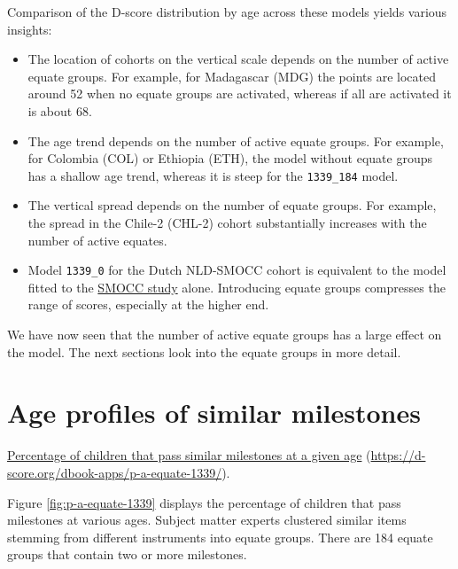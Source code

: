\documentclass[
]{book}
\begin{document}
Comparison of the D-score distribution by age across these models yields various insights:

\begin{itemize}
\item
  The location of cohorts on the vertical scale depends on the number of active equate groups. For example, for Madagascar (MDG) the points are located around 52 when no equate groups are activated, whereas if all are activated it is about 68.
\item
  The age trend depends on the number of active equate groups. For example, for Colombia (COL) or Ethiopia (ETH), the model without equate groups has a shallow age trend, whereas it is steep for the \texttt{1339\_184} model.
\item
  The vertical spread depends on the number of equate groups. For example, the spread in the Chile-2 (CHL-2) cohort substantially increases with the number of active equates.
\item
  Model \texttt{1339\_0} for the Dutch NLD-SMOCC cohort is equivalent to the model fitted to the \href{https://d-score.org/dbook1/sec-smoccstudy.html}{SMOCC study} alone. Introducing equate groups compresses the range of scores, especially at the higher end.
\end{itemize}

We have now seen that the number of active equate groups has a large effect on the model. The next sections look into the equate groups in more detail.

\hypertarget{sec:ageprofiles}{%
\section{Age profiles of similar milestones}\label{sec:ageprofiles}}

\label{fig:p-a-equate-1339}\href{https://d-score.org/dbook-apps/p-a-equate-1339/\#display=Percent_pass_by_age_for_all_equate_groups\&nrow=1\&ncol=1\&arr=row\&pg=65\&labels=equate\&sort=equate_index;asc\&filter=\&sidebar=\&fv=}{Percentage of children that pass similar milestones at a given age} (\url{https://d-score.org/dbook-apps/p-a-equate-1339/}).



Figure \ref{fig:p-a-equate-1339} displays the percentage of children that pass milestones at various ages. Subject matter experts clustered similar items stemming from different instruments into equate groups. There are 184 equate groups that contain two or more milestones.
\end{document}
